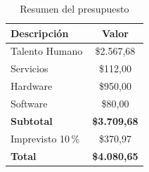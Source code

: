 \begin{table}[H]
\centering
\caption{Resumen del presupuesto}
\label{tab:resumen-presupuesto}
\begin{tabular}{|l|c|}
\hline
\rowcolor[HTML]{B6DAF8}
\textbf{Descripción}     & \textbf{Valor}       \\ \hline
Talento Humano           & \$2.567,68           \\ \hline
Servicios                & \$112,00             \\ \hline
Hardware                 & \$950,00             \\ \hline
Software                 & \$80,00              \\ \hline
\textbf{Subtotal}        & \textbf{\$3.709,68}  \\ \hline
Imprevisto 10\,\%        & \$370,97             \\ \hline
\rowcolor[HTML]{5BC0DE}
\textbf{Total}           & \textbf{\$4.080,65}  \\ \hline
\end{tabular}
\end{table}
